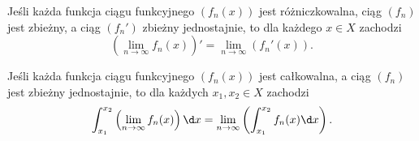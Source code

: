 \begin{theorem}
    \label{t:differentiable limit}
    Jeśli każda funkcja ciągu funkcyjnego $(f_n(x))$ jest różniczkowalna, ciąg $(f_n)$ jest zbieżny, a ciąg $(f_n')$ zbieżny jednostajnie, to dla każdego $x \in X$ zachodzi
    \[ \left(\lim_{n\to\infty} f_n(x)\right)' = \lim_{n\to\infty} \left(f_n'(x)\right). \]
\end{theorem}

\begin{theorem}
    \label{t:integrable limit}
    Jeśli każda funkcja ciągu funkcyjnego $(f_n(x))$ jest całkowalna, a ciąg $(f_n)$ jest zbieżny jednostajnie, to dla każdych $x_1, x_2 \in X$ zachodzi
    \[ \int_{x_1}^{x_2}\left(\lim_{n\to\infty} f_n(x)\right) \d x = \lim_{n\to\infty} \left(\int_{x_1}^{x_2} f_n(x) \d x\right). \]
\end{theorem}